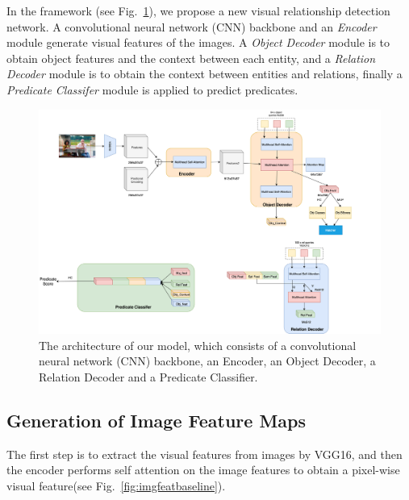 In the framework (see Fig.~\ref{fig:my_model}), we propose a new visual relationship detection network. A convolutional neural network (CNN) backbone and an \textit{Encoder} module generate visual features of the images. A \textit{Object Decoder} module is to obtain object features and  the context between each entity, and a \textit{Relation Decoder} module is to obtain the context between entities and relations, finally a \textit{Predicate Classifer} module is applied to predict predicates.

\begin{figure}[!htbp]
	\centering
	\includegraphics[width = 1\textwidth]{figures/my_model.png}
	\caption[The architecture of our model.]
	{The architecture of our model, which consists of a convolutional neural network (CNN) backbone, an Encoder, an Object Decoder, a Relation Decoder and a Predicate Classifier.}
	\label{fig:my_model}
\end{figure}

\label{sec:imagefeture}
\subsection{Generation of Image Feature Maps }

The first step is to extract the visual features from images by VGG16, and then the encoder performs self attention on the image features to obtain a pixel-wise visual feature(see Fig.~\ref{fig:imgfeatbaseline}).

